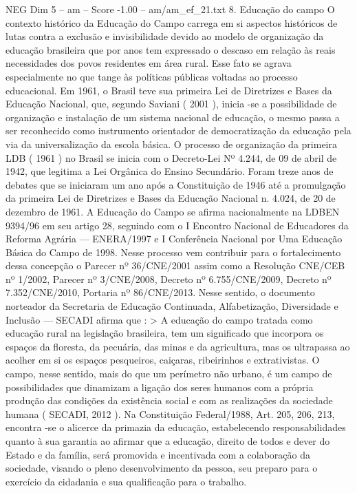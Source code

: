 \begin{textsample}{NEG Dim 5 – am – Score -1.00 – am/am\_ef\_21.txt}  \label{ex:f5_neg_228}
8.
Educação do campo O contexto histórico da Educação do Campo carrega em si aspectos históricos de lutas contra a exclusão e invisibilidade devido ao modelo de organização da educação brasileira que por anos tem expressado o descaso em relação às reais necessidades dos povos residentes em área rural.
Esse fato se agrava especialmente no que tange às políticas públicas voltadas ao processo educacional.
Em 1961, o Brasil teve sua primeira Lei de Diretrizes e Bases da Educação Nacional, que, segundo Saviani ( 2001 ), inicia -se a possibilidade de organização e instalação de um sistema nacional de educação, o mesmo passa a ser reconhecido como instrumento orientador de democratização da educação pela via da universalização da escola básica.
O processo de organização da primeira LDB ( 1961 ) no Brasil se inicia com o Decreto-Lei Nº 4.244, de 09 de abril de 1942, que legitima a Lei Orgânica do Ensino Secundário.
Foram treze anos de debates que se iniciaram um ano após a Constituição de 1946 até a promulgação da primeira Lei de Diretrizes e Bases da Educação Nacional n. 4.024, de 20 de dezembro de 1961.
A Educação do Campo se afirma nacionalmente na LDBEN 9394/96 em seu artigo 28, seguindo com o I Encontro Nacional de Educadores da Reforma Agrária — ENERA/1997 e I Conferência Nacional por Uma Educação Básica do Campo de 1998.
Nesse processo vem contribuir para o fortalecimento dessa concepção o Parecer nº 36/CNE/2001 assim como a Resolução CNE/CEB nº 1/2002, Parecer nº 3/CNE/2008, Decreto nº 6.755/CNE/2009, Decreto nº 7.352/CNE/2010, Portaria nº 86/CNE/2013.
Nesse sentido, o documento norteador da Secretaria de Educação Continuada, Alfabetização, Diversidade e Inclusão — SECADI afirma que : > A educação do campo tratada como educação rural na legislação brasileira, tem um significado que incorpora os espaços da floresta, da pecuária, das minas e da agricultura, mas os ultrapassa ao acolher em si os espaços pesqueiros, caiçaras, ribeirinhos e extrativistas.
O campo, nesse sentido, mais do que um perímetro não urbano, é um campo de possibilidades que dinamizam a ligação dos seres humanos com a própria produção das condições da existência social e com as realizações da sociedade humana ( SECADI, 2012 ).
Na Constituição Federal/1988, Art. 205, 206, 213, encontra -se o alicerce da primazia da educação, estabelecendo responsabilidades quanto à sua garantia ao afirmar que a educação, direito de todos e dever do Estado e da família, será promovida e incentivada com a colaboração da sociedade, visando o pleno desenvolvimento da pessoa, seu preparo para o exercício da cidadania e sua qualificação para o trabalho.

\end{textsample}
